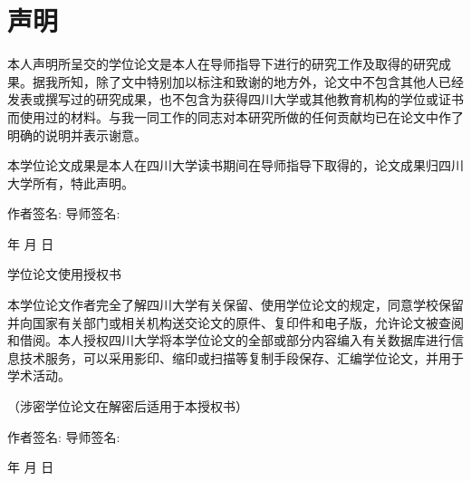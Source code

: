 
	\chapter*{声\hspace{0.8cm}明}


	\songti {}本人声明所呈交的学位论文是本人在导师指导下进行的研究工作及取得的研究成果。据我所知，除了文中特别加以标注和致谢的地方外，论文中不包含其他人已经发表或撰写过的研究成果，也不包含为获得四川大学或其他教育机构的学位或证书而使用过的材料。与我一同工作的同志对本研究所做的任何贡献均已在论文中作了明确的说明并表示谢意。
	
	本学位论文成果是本人在四川大学读书期间在导师指导下取得的，论文成果归四川大学所有，特此声明。
	
	\vspace{15pt}
	\songti {} 作者签名: \hspace{4cm} \songti {} 导师签名:
        \vspace{15pt}
        \begin{center}
            年 \hspace{0.5cm} 月 \hspace{0.5cm} 日
        \end{center}

        \vspace{140pt}

        \begin{center}
            \heiti {} {学位论文使用授权书}
        \end{center}

        \songti {}本学位论文作者完全了解四川大学有关保留、使用学位论文的规定，同意学校保留并向国家有关部门或相关机构送交论文的原件、复印件和电子版，允许论文被查阅和借阅。本人授权四川大学将本学位论文的全部或部分内容编入有关数据库进行信息技术服务，可以采用影印、缩印或扫描等复制手段保存、汇编学位论文，并用于学术活动。
	
	（涉密学位论文在解密后适用于本授权书）
	
	\vspace{15pt}
	\songti {} 作者签名: \hspace{4cm} \songti {} 导师签名:
        \vspace{15pt}
        \begin{center}
            年 \hspace{0.5cm} 月 \hspace{0.5cm} 日
        \end{center}